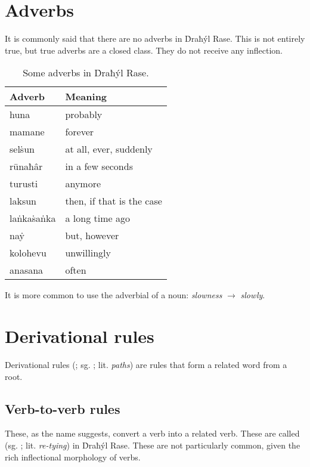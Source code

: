 \documentclass{book}
\begin{document}
\chapter{Adverbs}

It is commonly said that there are no adverbs in Ḋraħýl Rase. This is not entirely true, but true adverbs are a closed class. They do not receive any inflection.

\begin{table}[h]
    \caption{Some adverbs in Ḋraħýl Rase.}
    \centering
    \begin{tabular}{|l|l|}
        \hline
        Adverb & Meaning \\
        \hline
        huna & probably \\
        mamane & forever \\
        selṡun & at all, ever, suddenly \\
        rūnaħâr & in a few seconds \\
        turusti & anymore \\
        laksun & then, if that is the case \\
        laṅkaṡaṅka & a long time ago \\
        naẏ & but, however \\
        kolohevu & unwillingly \\
        anasana & often \\
        \hline
    \end{tabular}
\end{table}

It is more common to use the adverbial of a noun:  \emph{slowness} $\rightarrow$  \emph{slowly}.

\chapter{Derivational rules}

Derivational rules (; sg. ; lit. \emph{paths}) are rules that form a related word from a root.

\section{Verb-to-verb rules}

These, as the name suggests, convert a verb into a related verb. These are called  (sg. ; lit. \emph{re-tying}) in Ḋraħýl Rase. These are not particularly common, given the rich inflectional morphology of verbs.
\end{document}
